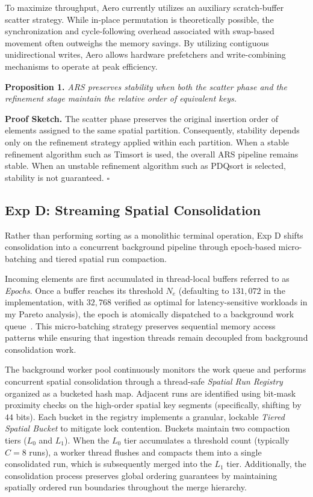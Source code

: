 To maximize throughput, Aero currently utilizes an auxiliary scratch-buffer scatter strategy.
While in-place permutation is theoretically possible, the synchronization and cycle-following overhead associated with swap-based movement often outweighs the memory savings.
By utilizing contiguous unidirectional writes, Aero allows hardware prefetchers and write-combining mechanisms to operate at peak efficiency.

\textbf{Proposition 1.}
\textit{ARS preserves stability when both the scatter phase and the refinement stage maintain the relative order of equivalent keys.}

\textbf{Proof Sketch.}
The scatter phase preserves the original insertion order of elements assigned to the same spatial partition. Consequently, stability depends only on the refinement strategy applied within each partition. When a stable refinement algorithm such as Timsort is used, the overall ARS pipeline remains stable. When an unstable refinement algorithm such as PDQsort is selected, stability is not guaranteed. \hfill $\square$

\subsection{Exp D: Streaming Spatial Consolidation}
Rather than performing sorting as a monolithic terminal operation, Exp D shifts consolidation into a concurrent background pipeline through epoch-based micro-batching and tiered spatial run compaction.

Incoming elements are first accumulated in thread-local buffers referred to as \textit{Epochs}.
Once a buffer reaches its threshold $N_e$ (defaulting to $131,072$ in the implementation, with $32,768$ verified as optimal for latency-sensitive workloads in my Pareto analysis), the epoch is atomically dispatched to a background work queue~\cite{zahariaDiscretizedStreamsFaulttolerant2013}.
This micro-batching strategy preserves sequential memory access patterns while ensuring that ingestion threads remain decoupled from background consolidation work.

The background worker pool continuously monitors the work queue and performs concurrent spatial consolidation through a thread-safe \textit{Spatial Run Registry} organized as a bucketed hash map.
Adjacent runs are identified using bit-mask proximity checks on the high-order spatial key segments (specifically, shifting by $44$ bits).
Each bucket in the registry implements a granular, lockable \textit{Tiered Spatial Bucket} to mitigate lock contention.
Buckets maintain two compaction tiers ($L_0$ and $L_1$).
When the $L_0$ tier accumulates a threshold count (typically $C = 8$ runs), a worker thread flushes and compacts them into a single consolidated run, which is subsequently merged into the $L_1$ tier.
Additionally, the consolidation process preserves global ordering guarantees by maintaining spatially ordered run boundaries throughout the merge hierarchy.

